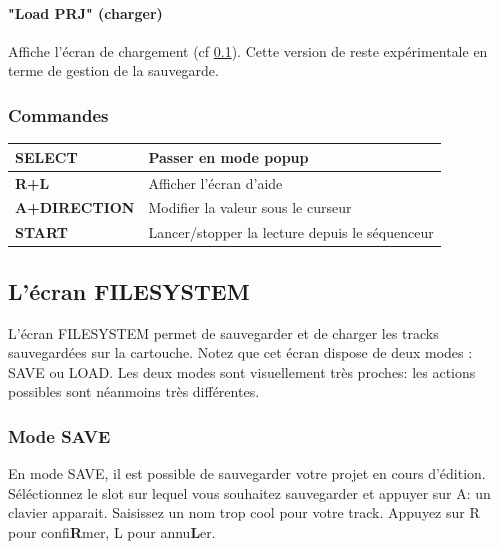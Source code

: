 \documentclass[12pt,a4paper]{article}
\begin{document}
        \paragraph{"Load PRJ" (charger)} Affiche l'écran de chargement (cf \ref{filesystem}). Cette version de \FAT reste expérimentale en terme de gestion de la sauvegarde.
    
        \subsubsection{Commandes}        
        \tablelasttail{\hline}
        \begin{supertabular}{|l|p{11cm}|}
        \hline
            {\bf SELECT} & Passer en mode popup \\
            \hline
            {\bf R+L} & Afficher l'écran d'aide \\
            \hline
            {\bf A+DIRECTION} & Modifier la valeur sous le curseur \\
            \hline
            {\bf START} & Lancer/stopper la lecture depuis le séquenceur \\ 
        \hline
        \end{supertabular}
    
    \subsection{L'écran FILESYSTEM}\label{filesystem}
    
    L'écran FILESYSTEM permet de sauvegarder et de charger les tracks sauvegardées sur la cartouche. Notez que cet écran dispose de deux modes : SAVE ou LOAD. Les deux modes sont visuellement très proches: les actions possibles sont néanmoins très différentes.
    
        \subsubsection{Mode SAVE}
        
        En mode SAVE, il est possible de sauvegarder votre projet en cours d'édition. Séléctionnez le slot sur lequel vous souhaitez sauvegarder et appuyer sur A: un clavier apparait. Saisissez un nom trop cool pour votre track. Appuyez sur R pour confi{\bf R}mer, L pour annu{\bf L}er.
        
\end{document}

